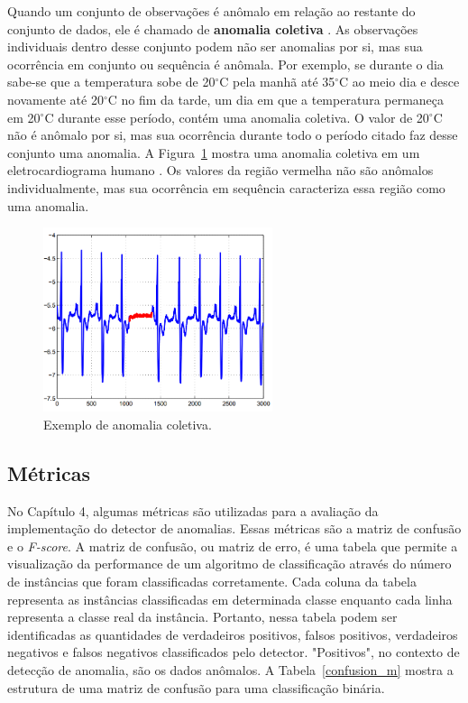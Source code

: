 \documentclass[cic,tc]{iiufrgs}
\begin{document}
Quando um conjunto de observações é anômalo em relação ao restante do conjunto de dados, ele é chamado de \textbf{anomalia coletiva} \cite{AnomalyDetectionSurvey2009}. As observações individuais dentro desse conjunto podem não ser anomalias por si, mas sua ocorrência em conjunto ou sequência é anômala. Por exemplo, se durante o dia sabe-se que a temperatura sobe de 20$^{\circ}$C pela manhã até 35$^{\circ}$C ao meio dia e desce novamente até 20$^{\circ}$C no fim da tarde, um dia em que a temperatura permaneça em 20$^{\circ}$C durante esse período, contém uma anomalia coletiva. O valor de 20$^{\circ}$C não é anômalo por si, mas sua ocorrência durante todo o período citado faz desse conjunto uma anomalia. A Figura~\ref{coletivas} mostra uma anomalia coletiva em um eletrocardiograma humano \cite{Goldberger}. Os valores da região vermelha não são anômalos individualmente, mas sua ocorrência em sequência caracteriza essa região como uma anomalia.


\begin{figure}
	\caption{Exemplo de anomalia coletiva.}
		\begin{center}
			\includegraphics[width=0.6\textwidth]{fig_coletivas.png}
		\end{center}
	\label{coletivas}
\end{figure}


\subsection{Métricas}
\label{metrics}
No Capítulo 4, algumas métricas são utilizadas para a avaliação da implementação do detector de anomalias. Essas métricas são a matriz de confusão e o \textit{F-score}. A matriz de confusão, ou matriz de erro, é uma tabela que permite a visualização da performance de um algoritmo de classificação através do número de instâncias que foram classificadas corretamente. Cada coluna da tabela representa as instâncias classificadas em determinada classe enquanto cada linha representa a classe real da instância. Portanto, nessa tabela podem ser identificadas as quantidades de verdadeiros positivos, falsos positivos, verdadeiros negativos e falsos negativos classificados pelo detector. "Positivos", no contexto de detecção de anomalia, são os dados anômalos. A Tabela~\ref{confusion_m} mostra a estrutura de uma matriz de confusão para uma classificação binária.
\end{document}
